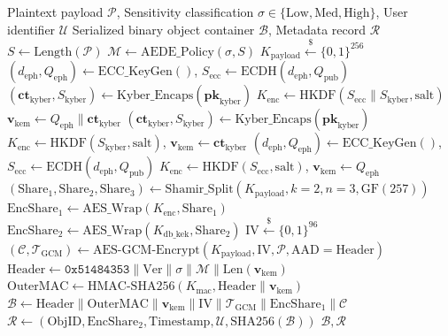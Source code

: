 \documentclass[pdflatex,sn-mathphys,Numbered]{sn-jnl}%
\theoremstyle{thmstyleone}%
\theoremstyle{thmstyletwo}%
\theoremstyle{thmstylethree}%
\begin{document}
\begin{algorithm}[!htbp]
\caption{Adaptive Quantum-Resistant File Ingestion and Key Distribution}
\label{alg:ingestion}
\begin{algorithmic}[1]
\Require Plaintext payload $\mathcal{P}$, Sensitivity classification $\sigma \in \{\text{Low}, \text{Med}, \text{High}\}$, User identifier $\mathcal{U}$
\Ensure Serialized binary object container $\mathcal{B}$, Metadata record $\mathcal{R}$
\State $S \gets \text{Length}(\mathcal{P})$
\State $\mathcal{M} \gets \text{AEDE\_Policy}(\sigma, S)$ 
\State $K_{\text{payload}} \xleftarrow{\$} \{0, 1\}^{256}$ 
    \State $(d_{\text{eph}}, Q_{\text{eph}}) \gets \text{ECC\_KeyGen}()$, $S_{\text{ecc}} \gets \text{ECDH}(d_{\text{eph}}, Q_{\text{pub}})$
    \State $(\mathbf{ct}_{\text{kyber}}, S_{\text{kyber}}) \gets \text{Kyber\_Encaps}(\mathbf{pk}_{\text{kyber}})$
    \State $K_{\text{enc}} \gets \text{HKDF}(S_{\text{ecc}} \parallel S_{\text{kyber}}, \text{salt})$
    \State $\mathbf{v}_{\text{kem}} \gets Q_{\text{eph}} \parallel \mathbf{ct}_{\text{kyber}}$
    \State $(\mathbf{ct}_{\text{kyber}}, S_{\text{kyber}}) \gets \text{Kyber\_Encaps}(\mathbf{pk}_{\text{kyber}})$
    \State $K_{\text{enc}} \gets \text{HKDF}(S_{\text{kyber}}, \text{salt})$, $\mathbf{v}_{\text{kem}} \gets \mathbf{ct}_{\text{kyber}}$
\Else
    \State $(d_{\text{eph}}, Q_{\text{eph}}) \gets \text{ECC\_KeyGen}()$, $S_{\text{ecc}} \gets \text{ECDH}(d_{\text{eph}}, Q_{\text{pub}})$
    \State $K_{\text{enc}} \gets \text{HKDF}(S_{\text{ecc}}, \text{salt})$, $\mathbf{v}_{\text{kem}} \gets Q_{\text{eph}}$
\EndIf
\State $(\text{Share}_1, \text{Share}_2, \text{Share}_3) \gets \text{Shamir\_Split}(K_{\text{payload}}, k=2, n=3, \text{GF}(257))$
\State $\text{EncShare}_1 \gets \text{AES\_Wrap}(K_{\text{enc}}, \text{Share}_1)$
\State $\text{EncShare}_2 \gets \text{AES\_Wrap}(K_{\text{db\_kek}}, \text{Share}_2)$
\State $\text{IV} \xleftarrow{\$} \{0, 1\}^{96}$
\State $(\mathcal{C}, \mathcal{T}_{\text{GCM}}) \gets \text{AES-GCM-Encrypt}(K_{\text{payload}}, \text{IV}, \mathcal{P}, \text{AAD}=\text{Header})$
\State $\text{Header} \gets \texttt{0x51484353} \parallel \text{Ver} \parallel \sigma \parallel \mathcal{M} \parallel \text{Len}(\mathbf{v}_{\text{kem}})$
\State $\text{OuterMAC} \gets \text{HMAC-SHA256}(K_{\text{mac}}, \text{Header} \parallel \mathbf{v}_{\text{kem}})$
\State $\mathcal{B} \gets \text{Header} \parallel \text{OuterMAC} \parallel \mathbf{v}_{\text{kem}} \parallel \text{IV} \parallel \mathcal{T}_{\text{GCM}} \parallel \text{EncShare}_1 \parallel \mathcal{C}$
\State $\mathcal{R} \gets (\text{ObjID}, \text{EncShare}_2, \text{Timestamp}, \mathcal{U}, \text{SHA256}(\mathcal{B}))$
\State \Return $\mathcal{B}, \mathcal{R}$
\end{algorithmic}
\end{algorithm}
\end{document}

